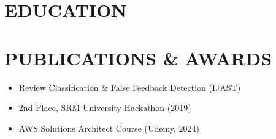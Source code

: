 \documentclass[letterpaper,10pt]{article}
\newcommand{\resumeItem}[1]{\item\small #1}
\newcommand{\resumeSubheading}[4]{
  \vspace{6pt}
  \noindent
  \textbf{#1} \hfill {\footnotesize #2} \\
  [-1pt]
  \noindent
  \small #3 \hfill {\small #4}
  \vspace{3pt}
}
\newcommand{\resumeItemsStart}{\vspace{-2pt}\begin{itemize}}
\newcommand{\resumeItemsEnd}{\end{itemize}\vspace{6pt}}
\begin{document}
\section{\textcolor{metablue}{EDUCATION}}
\vspace{-10pt}


\vspace{-10pt}

\section{\textcolor{metablue}{PUBLICATIONS \& AWARDS}}
\vspace{-5pt}
\begin{itemize}
\resumeItem{Review Classification \& False Feedback Detection (IJAST)}
\resumeItem{2nd Place, SRM University Hackathon (2019)}
\resumeItem{AWS Solutions Architect Course (Udemy, 2024)}
\end{itemize}
\end{document}
